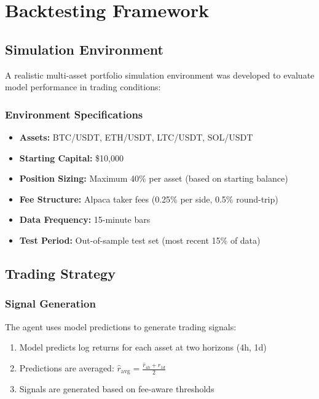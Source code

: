 \documentclass[12pt,a4paper]{article}
\begin{document}
\section{Backtesting Framework}

\subsection{Simulation Environment}
A realistic multi-asset portfolio simulation environment was developed to evaluate model performance in trading conditions:

\subsubsection{Environment Specifications}
\begin{itemize}
    \item \textbf{Assets:} BTC/USDT, ETH/USDT, LTC/USDT, SOL/USDT
    \item \textbf{Starting Capital:} \$10,000
    \item \textbf{Position Sizing:} Maximum 40\% per asset (based on starting balance)
    \item \textbf{Fee Structure:} Alpaca taker fees (0.25\% per side, 0.5\% round-trip)
    \item \textbf{Data Frequency:} 15-minute bars
    \item \textbf{Test Period:} Out-of-sample test set (most recent 15\% of data)
\end{itemize}

\subsection{Trading Strategy}

\subsubsection{Signal Generation}
The agent uses model predictions to generate trading signals:
\begin{enumerate}
    \item Model predicts log returns for each asset at two horizons (4h, 1d)
    \item Predictions are averaged: $\hat{r}_{\text{avg}} = \frac{\hat{r}_{4h} + \hat{r}_{1d}}{2}$
    \item Signals are generated based on fee-aware thresholds
\end{enumerate}
\end{document}
